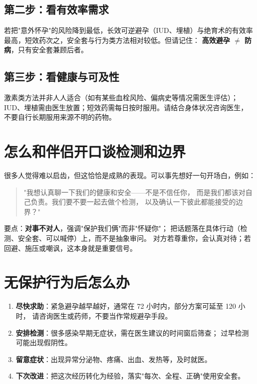 \documentclass[12pt,UTF8,openany]{ctexbook}
\begin{document}
\subsection*{第二步：看有效率需求}

若把"意外怀孕"的风险降到最低，长效可逆避孕（IUD、埋植）与绝育术的有效率
最高，短效药次之，安全套与行为类方法相对较低。但请记住：
\textbf{高效避孕 $\neq$ 防病}，只有安全套兼顾后者。

\subsection*{第三步：看健康与可及性}

激素类方法并非人人适合（如有某些血栓风险、偏病史等情况需医生评估）；
IUD、埋植需由医生放置；短效药需每日按时服用。请结合身体状况咨询医生，
不要自行长期服用来源不明的药物。

\section{怎么和伴侣开口谈检测和边界}

很多人觉得难以启齿，但这恰恰是成熟的表现。可以事先想好一句开场白，例如：

\begin{quote}
"我想认真聊一下我们的健康和安全——不是不信任你，
而是我们都该对自己负责。我们要不要一起去做个检测，
以及确认一下彼此都能接受的边界？"
\end{quote}

要点：\textbf{对事不对人}，强调"保护我们俩"而非"怀疑你"；
把话题落在具体行动（检测、安全套、可以喊停）上，而不是抽象审问。
对方若尊重你，会认真对待；若回避、施压或嘲讽，这本身就是重要信号。

\section{无保护行为后怎么办}

\begin{enumerate}[leftmargin=2em,itemsep=0.3em]
  \item \textbf{尽快求助}：紧急避孕越早越好，通常在 72 小时内，部分方案可延至 120 小时，
        请咨询医生或药师，不要当作常规避孕手段。
  \item \textbf{安排检测}：很多感染早期无症状，需在医生建议的时间窗后筛查；
        过早检测可能出现假阴性。
  \item \textbf{留意症状}：出现异常分泌物、疼痛、出血、发热等，及时就医。
  \item \textbf{下次改进}：把这次经历转化为经验，落实"每次、全程、正确"使用安全套。
\end{enumerate}
\end{document}
